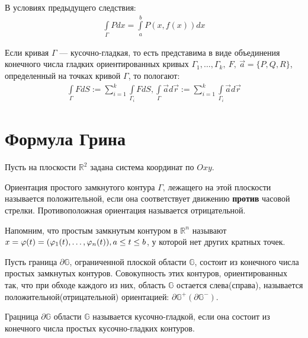 \begin{consequence}
  В условиях предыдущего следствия:
  \begin{gather}
    \int\limits_\Gamma Pdx = \int\limits_a^b P(x, f(x)) dx
    \label{cons621:eq2}
  \end{gather}
\end{consequence}

\begin{definition}
  Если кривая $\Gamma$ --- кусочно-гладкая, то есть представима в виде
  объединения конечного числа гладких ориентированных кривых $\Gamma_1, \dots,
  \Gamma_k, \ F, \ \vec a = \{P, Q, R\}$, определенный на точках кривой
  $\Gamma$, то пологают:
  \begin{gather*}
    \int\limits_\Gamma F dS := \sum\limits_{i = 1}^{k} \int\limits_{\Gamma_i} F
    dS, \int\limits_\Gamma \vec a d \vec r := \sum\limits_{i = 1}^{k}
    \int\limits_{\Gamma_i} \vec a d \vec r
  \end{gather*}
\end{definition}

\section{Формула Грина}
Пусть на плоскости $\mathbb{R}^2$ задана система координат по $Oxy$.

\begin{definition}
  Ориентация простого замкнутого контура $\Gamma$, лежащего на этой плоскости
  называется положительной, если она соответствует движению {\bfseries против}
  часовой стрелки. Противоположная ориентация называется отрицательной.
\end{definition}

Напомним, что простым замкнутым контуром в $\mathbb{R}^n$ называют $x =
\varphi(t) = (\varphi_1(t), \dots, \varphi_n(t)), \\ a \leq t \leq b$, у
которой нет других кратных точек.

\begin{definition}
  Пусть граница $\partial \mathbb{G}$, ограниченной плоской области
  $\mathbb{G}$,
  состоит из конечного числа простых замкнутых контуров. Совокупность этих
  контуров, ориентированных так, что при обходе каждого из них, область
  $\mathbb{G}$ остается слева(справа), называется положительной(отрицательной)
  ориентацией: $\partial \mathbb{G}^+ (\partial \mathbb{G}^-)$.
\end{definition}

\begin{definition}
  Грацница $\partial \mathbb{G}$ области $\mathbb{G}$ называется
  кусочно-гладкой, если она состоит из конечного числа простых кусочно-гладких
  контуров.
\end{definition}

